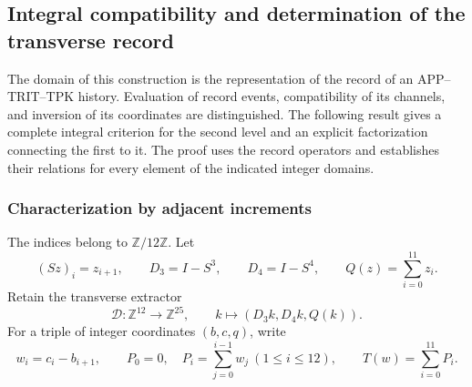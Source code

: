 \subsection{Integral compatibility and determination of the transverse record}
\label{img09:seccion}

The domain of this construction is the representation of the record of an
APP--TRIT--TPK history. Evaluation of record events,
compatibility of its channels, and inversion of its
coordinates are distinguished. The following result gives a complete integral criterion for
the second level and an explicit factorization connecting the first to it.
The proof uses the record operators and establishes their
relations for every element of the indicated integer domains.

\subsubsection{Characterization by adjacent increments}

The indices belong to $\mathbb Z/12\mathbb Z$. Let
\[
 (Sz)_i=z_{i+1},\qquad D_3=I-S^3,\qquad D_4=I-S^4,
 \qquad Q(z)=\sum_{i=0}^{11}z_i.
\]
Retain the transverse extractor
\[
 \mathcal D:\mathbb Z^{12}\longrightarrow\mathbb Z^{25},
 \qquad k\longmapsto(D_3k,D_4k,Q(k)).
\]
For a triple of integer coordinates $(b,c,q)$, write
\begin{equation}
 w_i=c_i-b_{i+1},\qquad
 P_0=0,\quad P_i=\sum_{j=0}^{i-1}w_j\ (1\leq i\leq12),
 \qquad T(w)=\sum_{i=0}^{11}P_i.
 \label{img09:incremento}
\end{equation}

